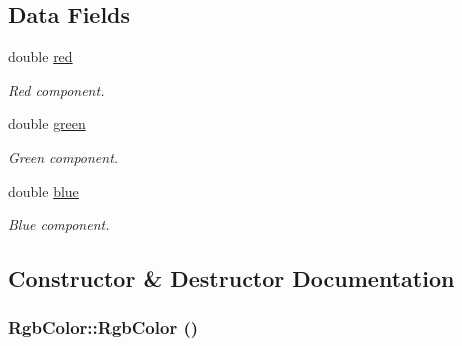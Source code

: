 \subsection*{Data Fields}
\begin{CompactItemize}
\item 
\hypertarget{struct_rgb_color_fad3108eb5b0c11d4a63aaed7d1e4b96}{
double \hyperlink{struct_rgb_color_fad3108eb5b0c11d4a63aaed7d1e4b96}{red}}
\label{struct_rgb_color_fad3108eb5b0c11d4a63aaed7d1e4b96}

\begin{CompactList}\small\item\em Red component. \item\end{CompactList}\item 
\hypertarget{struct_rgb_color_2af04c7110fa165ce281f92177655e74}{
double \hyperlink{struct_rgb_color_2af04c7110fa165ce281f92177655e74}{green}}
\label{struct_rgb_color_2af04c7110fa165ce281f92177655e74}

\begin{CompactList}\small\item\em Green component. \item\end{CompactList}\item 
\hypertarget{struct_rgb_color_497f845fced68cbe4fabb5c34d05f682}{
double \hyperlink{struct_rgb_color_497f845fced68cbe4fabb5c34d05f682}{blue}}
\label{struct_rgb_color_497f845fced68cbe4fabb5c34d05f682}

\begin{CompactList}\small\item\em Blue component. \item\end{CompactList}\end{CompactItemize}


\subsection{Constructor \& Destructor Documentation}
\hypertarget{struct_rgb_color_264da0270aca412d62197e046b71b08e}{
\subsubsection[RgbColor]{\setlength{\rightskip}{0pt plus 5cm}RgbColor::RgbColor ()}}
\label{struct_rgb_color_264da0270aca412d62197e046b71b08e}



